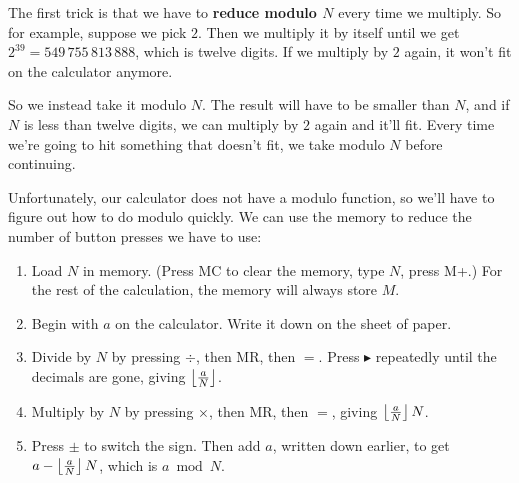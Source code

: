 \documentclass[11pt,paper=letter]{scrartcl}
\begin{document}
The first trick is that we have to \textbf{reduce modulo $N$} every time we multiply. So for example, suppose we pick $2$. Then we multiply it by itself until we get $2^{39} = 549\,755\,813\,888$, which is twelve digits. If we multiply by $2$ again, it won't fit on the calculator anymore.

So we instead take it modulo $N$. The result will have to be smaller than $N$, and if $N$ is less than twelve digits, we can multiply by $2$ again and it'll fit. Every time we're going to hit something that doesn't fit, we take modulo $N$ before continuing.

Unfortunately, our calculator does not have a modulo function, so we'll have to figure out how to do modulo quickly. We can use the memory to reduce the number of button presses we have to use:



\begin{enumerate}
  \item Load $N$ in memory. (Press MC to clear the memory, type $N$, press M+.) For the rest of the calculation, the memory will always store $M$.
  \item Begin with $a$ on the calculator. Write it down on the sheet of paper.
  \item Divide by $N$ by pressing $\div$, then MR, then $=$. Press $\blacktriangleright$ repeatedly until the decimals are gone, giving $\left\lfloor \frac{a}{N} \right\rfloor$.
  \item Multiply by $N$ by pressing $\times$, then MR, then $=$, giving $\left\lfloor \frac{a}{N} \right\rfloor N$.
  \item Press $\pm$ to switch the sign. Then add $a$, written down earlier, to get $a - \left\lfloor \frac{a}{N} \right\rfloor N$, which is $a \bmod N$.
\end{enumerate}
\end{document}
